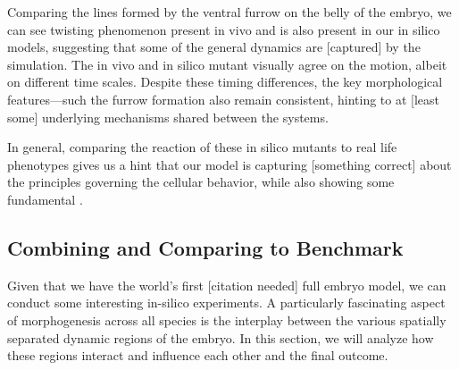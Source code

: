 Comparing the lines formed by the ventral furrow on the belly of the embryo, we can see twisting phenomenon present in vivo and is also present in our in silico models, suggesting that some of the general dynamics are [captured] by the simulation. The in vivo and in silico mutant visually agree on the motion, albeit on different time scales. Despite these timing differences, the key morphological features—such the furrow formation also remain consistent, hinting to at [least some] underlying mechanisms shared between the systems.


In general, comparing the reaction of these in silico mutants to real life phenotypes gives us a hint that our model is capturing [something correct] about the principles governing the cellular behavior, while also showing some fundamental . 






\subsection{Combining and Comparing to Benchmark}


Given that we have the world’s first [citation needed] full embryo model, we can conduct some interesting in-silico experiments. A particularly fascinating aspect of morphogenesis across all species is the interplay between the various spatially separated dynamic regions of the embryo. In this section, we will analyze how these regions interact and influence each other and the final outcome.

